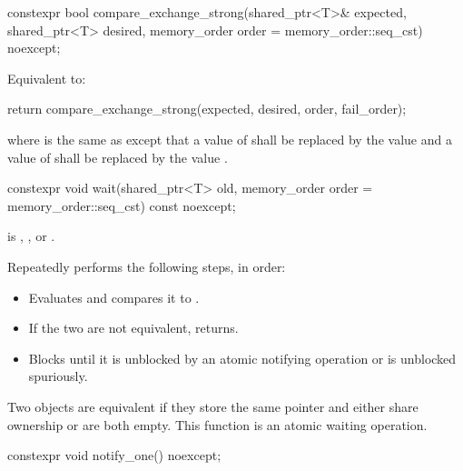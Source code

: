 %
\begin{itemdecl}
constexpr bool compare_exchange_strong(shared_ptr<T>& expected, shared_ptr<T> desired,
                                       memory_order order = memory_order::seq_cst) noexcept;
\end{itemdecl}

\begin{itemdescr}
\pnum
\effects
Equivalent to:
\begin{codeblock}
return compare_exchange_strong(expected, desired, order, fail_order);
\end{codeblock}
where  is the same as 
except that a value of 
shall be replaced by the value  and
a value of 
shall be replaced by the value .
\end{itemdescr}

%
\begin{itemdecl}
constexpr void wait(shared_ptr<T> old, memory_order order = memory_order::seq_cst) const noexcept;
\end{itemdecl}

\begin{itemdescr}
\pnum
\expects
{} is
,
, or
.

\pnum
\effects
Repeatedly performs the following steps, in order:
\begin{itemize}
\item
  Evaluates  and compares it to .
\item
  If the two are not equivalent, returns.
\item
  Blocks until it
  is unblocked by an atomic notifying operation or is unblocked spuriously.
\end{itemize}

\pnum
\remarks
Two  objects are equivalent
if they store the same pointer and either share ownership or are both empty.
This function is an atomic waiting operation.
\end{itemdescr}

%
\begin{itemdecl}
constexpr void notify_one() noexcept;
\end{itemdecl}

